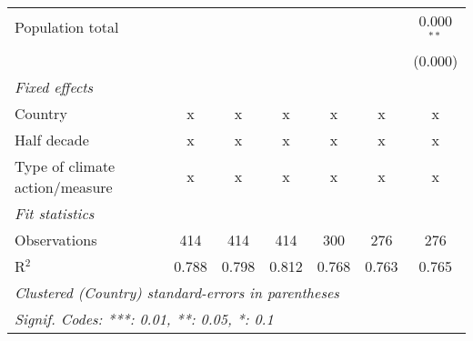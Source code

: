 \begin{tabular}{lcccccc}
   Population total                                                &         &                &                &                &                & 0.000$^{**}$\\   
                                                                   &         &                &                &                &                & (0.000)\\   
   \emph{Fixed effects}\\
   Country                                                         & x       & x              & x              & x              & x              & x\\  
   Half decade                                                     & x       & x              & x              & x              & x              & x\\  
   Type of climate action/measure                                  & x       & x              & x              & x              & x              & x\\  
   \midrule \emph{Fit statistics}\\
   Observations                                                    & 414     & 414            & 414            & 300            & 276            & 276\\  
   R$^2$                                                           & 0.788   & 0.798          & 0.812          & 0.768          & 0.763          & 0.765\\  
   \midrule
   \multicolumn{7}{l}{\emph{Clustered (Country) standard-errors in parentheses}}\\
   \multicolumn{7}{l}{\emph{Signif. Codes: ***: 0.01, **: 0.05, *: 0.1}}\\
\end{tabular}
\par\endgroup


